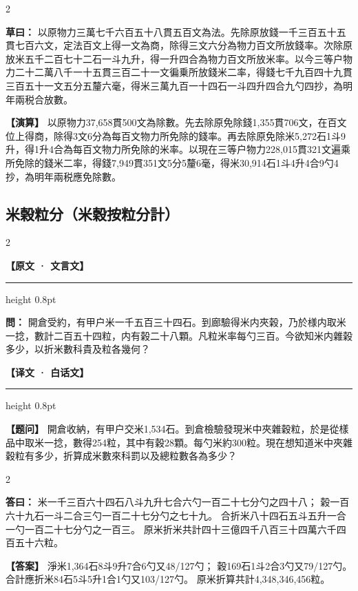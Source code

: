 \documentclass[11pt,a4paper]{article}
\newcommand{\ClassicalQuestion}[1]{\par\noindent\textbf{\color{problemcolor}問：}#1\par}
\newcommand{\ClassicalAnswer}[1]{\par\noindent\textbf{\color{answercolor}答曰：}#1\par}
\newcommand{\ClassicalWorking}[1]{\par\noindent\textbf{草曰：}#1\par}
\newcommand{\ModernQuestion}[1]{\par\noindent\textbf{\color{modernlabel}【题问】}#1\par}
\newcommand{\ModernAnswer}[1]{\par\noindent\textbf{\color{answercolor}【答案】}#1\par}
\newcommand{\ModernWorking}[1]{\par\noindent\textbf{【演算】}#1\par}
\newcommand{\ClassicalHeader}{%
  \begin{center}\textbf{\color{headerclassical}【原文 · 文言文】}\end{center}
  \vspace{-0.5em}
  \hrule height 0.8pt
  \vspace{0.5em}
}
\newcommand{\ModernHeader}{%
  \begin{center}\textbf{\color{headermodern}【译文 · 白话文】}\end{center}
  \vspace{-0.5em}
  \hrule height 0.8pt
  \vspace{0.5em}
}
\begin{document}
\begin{paracol}{2}

\ClassicalWorking{%
以原物力三萬七千六百五十八貫五百文為法。先除原放錢一千三百五十五貫七百六文，定法百文上得一文為商，除得三文六分為物力百文所放錢率。次除原放米五千二百七十二石一斗九升，得一升四合為物力百文所放米率。以今三等户物力二十二萬八千一十五貫三百二十一文徧乗所放錢米二率，得錢七千九百四十九貫三百五十一文五分五釐六毫，得米三萬九百一十四石一斗四升四合九勺四抄，為明年兩税合放數。}

\switchcolumn

\ModernWorking{%
以原物力37,658貫500文為除數。先去除原免除錢1,355貫706文，在百文位上得商，除得3文6分為每百文物力所免除的錢率。再去除原免除米5,272石1斗9升，得1升4合為每百文物力所免除的米率。以現在三等户物力228,015貫321文遍乘所免除的錢米二率，得錢7,949貫351文5分5釐6毫，得米30,914石1斗4升4合9勺4抄，為明年兩税應免除數。
}

\end{paracol}

\newpage
\subsection*{\color{sectioncolor}米榖粒分（米穀按粒分計）}

\begin{paracol}{2}

\ClassicalHeader

\ClassicalQuestion{%
開倉受約，有甲户米一千五百三十四石。到廊驗得米内夾榖，乃於様内取米一捻，數計二百五十四粒，内有榖二十八顆。凡粒米率每勺三百。今欲知米内雜榖多少，以折米數科貴及粒各幾何？}

\switchcolumn

\ModernHeader

\ModernQuestion{%
開倉收納，有甲户交米1,534石。到倉檢驗發現米中夾雜穀粒，於是從樣品中取米一捻，數得254粒，其中有穀28顆。每勺米約300粒。現在想知道米中夾雜穀粒有多少，折算成米數來科罰以及總粒數各為多少？
}

\end{paracol}

\begin{paracol}{2}

\ClassicalAnswer{%
米一千三百六十四石八斗九升七合六勺一百二十七分勺之四十八；
榖一百六十九石一斗二合三勺一百二十七分勺之七十九。
合折米八十四石五斗五升一合一勺一百二十七分勺之一百三。
原米折米共計四十三億四千八百三十四萬六千四百五十六粒。}

\switchcolumn

\ModernAnswer{%
淨米1,364石8斗9升7合6勺又48/127勺；
穀169石1斗2合3勺又79/127勺。
合計應折米84石5斗5升1合1勺又103/127勺。
原米折算共計4,348,346,456粒。
}

\end{paracol}
\end{document}
